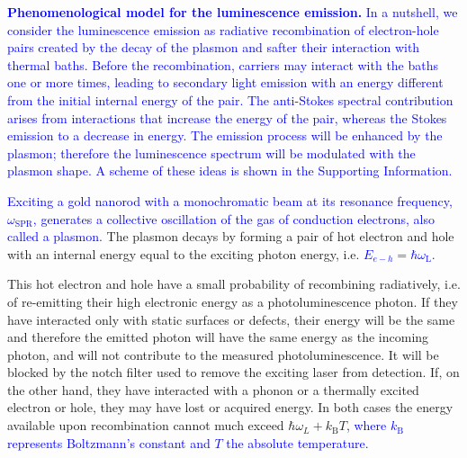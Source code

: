 \documentclass[journal=nalefd,manuscript=letter]{achemso}
\newcommand{\HI}[1]{\textcolor{blue}{#1}} %
\newcommand{\fs}{\ensuremath{\,\textrm{fs}}}
\newcommand{\ps}{\ensuremath{\,\textrm{ps}}}
\begin{document}
\HI{\textbf{Phenomenological model for the luminescence emission.} 
In a nutshell, we consider the luminescence emission as radiative recombination of
electron-hole pairs created by the decay of the plasmon and safter their interaction
with thermal baths. Before the recombination, carriers may interact with the baths one or more
times, leading to secondary light emission with an energy different from the initial internal energy of the pair. 
The anti-Stokes spectral contribution arises from interactions that increase the energy 
of the pair, whereas the Stokes emission to a decrease in energy. The emission process will be 
enhanced by the plasmon; therefore the luminescence spectrum will be modulated with the plasmon shape. 
A scheme of these ideas is shown in the Supporting Information.}

\HI{Exciting a gold nanorod with a monochromatic beam at its resonance frequency, $\omega_\textrm{SPR}$, generates a collective oscillation of the gas of conduction electrons, also called a plasmon.} 
The plasmon decays by forming a pair of hot electron and hole with an internal energy equal to the exciting
photon energy\cite{Sundararaman2014,Brongersma2015,AlejandroManjavacasJunG.LiuVikramKulkarni2014}, 
i.e. \HI{ $E_{e-h}=\hbar \omega_\textrm{L}$.}

This hot electron and hole have a small probability of recombining radiatively, i.e. of 
re-emitting their high electronic energy as a photoluminescence photon. If they
have interacted only with static surfaces or defects, their energy will be the same and
therefore the emitted photon will have the same energy as the incoming
photon, and will not contribute to the measured photoluminescence. It will be
blocked by the notch filter used to remove the exciting laser from detection.
If, on the other hand, they have interacted with a
phonon or a thermally excited electron or hole, they may have lost or acquired
energy.
In both cases the energy available upon
recombination cannot much exceed $\hbar\omega_L+k_\textrm{B}T$, \HI{where $k_\textrm{B}$ 
represents Boltzmann's constant and $T$ the absolute temperature.} 
\end{document}
